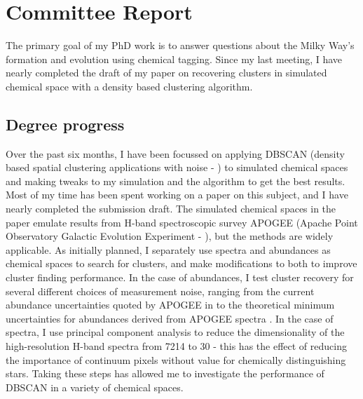 \documentclass[11pt]{article}
\begin{document}
    
    \section*{Committee Report}
    
    The primary goal of my PhD work is to answer questions about the Milky Way's formation and evolution using chemical tagging. Since my last meeting, I have nearly completed the draft of my paper on recovering clusters in simulated chemical space with a density based clustering algorithm.    

    \subsection*{Degree progress}

	Over the past six months, I have been focussed on applying DBSCAN (density based spatial clustering applications with noise - \citealt{Ester1996}) to simulated chemical spaces and making tweaks to my simulation and the algorithm to get the best results. Most of my time has been spent working on a paper on this subject, and I have nearly completed the submission draft. The simulated chemical spaces in the paper emulate results from H-band spectroscopic survey APOGEE (Apache Point Observatory Galactic Evolution Experiment - \citealt{Majewski2017}), but the methods are widely applicable. As initially planned, I separately use spectra and abundances as chemical spaces to search for clusters, and make modifications to both to improve cluster finding performance. In the case of abundances, I test cluster recovery for several different choices of measurement noise, ranging from the current abundance uncertainties quoted by APOGEE in \citet{Abolfathi2018} to the theoretical minimum uncertainties for abundances derived from APOGEE spectra \citep{Ting2016b}. In the case of spectra, I use principal component analysis to reduce the dimensionality of the high-resolution H-band spectra from 7214 to 30 - this has the effect of reducing the importance of continuum pixels without value for chemically distinguishing stars. Taking these steps has allowed me to investigate the performance of DBSCAN in a variety of chemical spaces.
	
\end{document}
